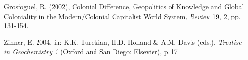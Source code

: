 \documentclass{iau}
\begin{document}
\begin{thebibliography}{}

{Grosfoguel, R. (2002)}, {Colonial Difference, Geopolitics of Knowledge
  and Global Coloniality 
  in the Modern/Colonial Capitalist World System}, 
\textit{Review} 19, 2, pp. 131-154.

{Zinner, E.} 2004, in: K.K. Turekian, H.D. Holland \& A.M. Davis (eds.), 
 \textit{Treatise in Geochemistry 1} (Oxford and San Diego: Elsevier), p.\,17

\end{thebibliography}
\end{document}

